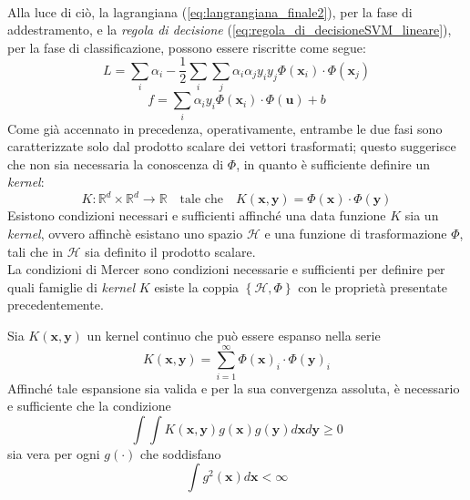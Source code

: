 \\
Alla luce di ciò, la lagrangiana (\ref{eq:langrangiana_finale2}), per la fase di addestramento, e la \emph{regola di decisione} (\ref{eq:regola_di_decisioneSVM_lineare}), per la fase di classificazione, possono essere riscritte come segue:
\begin{equation}
\label{eq:lagrangiana_con_funzione_di_trasformazione}
L=\sum_i\alpha_i-\dfrac{1}{2}\sum_i\sum_j\alpha_i\alpha_jy_iy_j\Phi(\mathbf{x}_i)\cdot\Phi(\mathbf{x}_j)
\end{equation}
\begin{equation}
\label{eq:regola_di_decisione_con_funzione_di_trasformazione}
f=\sum_i\alpha_iy_i\Phi(\mathbf{x}_i)\cdot\Phi(\mathbf{u})+b
\end{equation}
Come già accennato in precedenza, operativamente, entrambe le due fasi sono caratterizzate solo dal prodotto scalare dei vettori trasformati; questo suggerisce che non sia necessaria la conoscenza di $\Phi$, in quanto è sufficiente definire un \emph{kernel}:
\begin{equation}
\label{eq:kernel_trick}
K:\mathbb{R}^d\times\mathbb{R}^d\rightarrow\mathbb{R}\quad\text{tale che}\quad K(\mathbf{x},\mathbf{y})=\Phi(\mathbf{x})\cdot\Phi(\mathbf{y})
\end{equation}
Esistono condizioni necessari e sufficienti affinché una data funzione $K$ sia un \emph{kernel}, ovvero affinchè esistano uno spazio $\mathcal{H}$ e una funzione di trasformazione $\Phi$, tali che in $\mathcal{H}$ sia definito il prodotto scalare. \\
La condizioni di Mercer sono condizioni necessarie e sufficienti per definire per quali famiglie di \emph{kernel} $K$ esiste la coppia $\left\lbrace\mathcal{H},\Phi\right\rbrace$ con le proprietà presentate precedentemente.\\
\begin{teorema}
Sia $K(\mathbf{x},\mathbf{y})$ un kernel continuo che può essere espanso nella serie
\begin{equation}
\label{eq:condizioni_di_Mercer1}
K(\mathbf{x},\mathbf{y})=\sum_{i=1}^\infty\Phi(\mathbf{x})_i\cdot\Phi(\mathbf{y})_i
\end{equation}
Affinché tale espansione sia valida e per la sua convergenza assoluta, è necessario e sufficiente che la condizione
\begin{equation}
\label{eq:condizioni_di_Mercer2}
\int\int K(\mathbf{x},\mathbf{y})g(\mathbf{x})g(\mathbf{y})d\mathbf{x}d\mathbf{y}\geq0
\end{equation}
sia vera per ogni $g(\cdot)$ che soddisfano
\begin{equation}
\label{eq:}
\int g^2(\mathbf{x})d\mathbf{x}<\infty
\end{equation}
\end{teorema}

